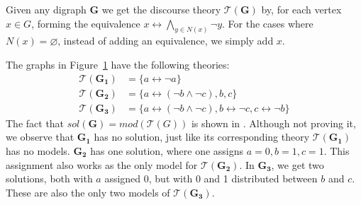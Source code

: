 Given any digraph \textbf{G} we get the discourse theory $\mathcal{T}(\mathbf{G})$ by, for each vertex $x \in G$, forming the equivalence $x \leftrightarrow \bigwedge_{y \in N(x)} \neg y$.
For the cases where $N(x) = \varnothing$, instead of adding an equivalence, we simply add $x$.\par
\begin{figure}[!h]
  \centering
  \caption{}
  \label{ex:3graphs}
\end{figure}
\FloatBarrier
The graphs in Figure~\ref{ex:3graphs} have the following theories:
\begin{align}
  \mathcal{T}(\mathbf{G_1}) &= \big \{ a \leftrightarrow \neg a \big \} \\
  \mathcal{T}(\mathbf{G_2}) &= \big \{ a \leftrightarrow (\neg b \wedge \neg c), b, c \big \}\\
  \mathcal{T}(\mathbf{G_3}) &= \big \{ a \leftrightarrow (\neg b \wedge \neg c), b \leftrightarrow \neg c, c \leftrightarrow \neg b \big \}
\end{align}
The fact that $sol(\mathbf{G}) = mod(\mathcal{T}(G))$ is shown in \cite{apal-digraph}.
Although not proving it, we observe that $\mathbf{G_1}$ has no solution, just like its corresponding theory $\mathcal{T}(\mathbf{G_1})$ has no models.
$\mathbf{G_2}$ has one solution, where one assigns $a=0, b=1, c=1$.
This assignment also works as the only model for $\mathcal{T}(\mathbf{G_2})$.
In $\mathbf{G_3}$, we get two solutions, both with $a$ assigned 0, but with 0 and 1 distributed between $b$ and $c$.
These are also the only two models of $\mathcal{T}(\mathbf{G_3})$.

